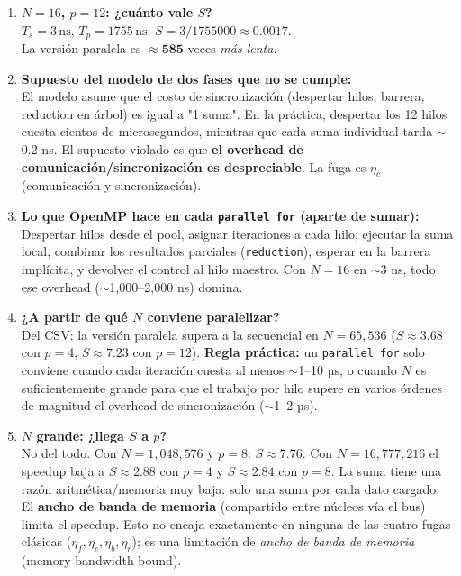 \documentclass[12pt,letterpaper]{article}
\begin{document}
\begin{enumerate}[start=3]

\item \textbf{$N=16$, $p=12$: ¿cuánto vale $S$?}\\
$T_s = 3\,\text{ns}$, $T_p = 1755\,\text{ns}$: $S = 3/1755000 \approx \mathbf{0.0017}$.\\
La versión paralela es $\approx \mathbf{585}$ veces \emph{más lenta}.

\item \textbf{Supuesto del modelo de dos fases que no se cumple:}\\
El modelo asume que el costo de sincronización (despertar hilos, barrera, reduction en árbol) es igual a "1 suma". En la práctica, despertar los 12 hilos cuesta cientos de microsegundos, mientras que cada suma individual tarda $\sim$0.2 ns. El supuesto violado es que \textbf{el overhead de comunicación/sincronización es despreciable}. La fuga es $\eta_c$ (comunicación y sincronización).

\item \textbf{Lo que OpenMP hace en cada \texttt{parallel for} (aparte de sumar):}\\
Despertar hilos desde el pool, asignar iteraciones a cada hilo, ejecutar la suma local, combinar los resultados parciales (\texttt{reduction}), esperar en la barrera implícita, y devolver el control al hilo maestro. Con $N=16$ en $\sim$3 ns, todo ese overhead ($\sim$1{,}000–2{,}000 ns) domina.

\item \textbf{¿A partir de qué $N$ conviene paralelizar?}\\
Del CSV: la versión paralela supera a la secuencial en $N = 65{,}536$ ($S \approx 3.68$ con $p=4$, $S \approx 7.23$ con $p=12$). \textbf{Regla práctica:} un \texttt{parallel for} solo conviene cuando cada iteración cuesta al menos $\sim$1–10 µs, o cuando $N$ es suficientemente grande para que el trabajo por hilo supere en varios órdenes de magnitud el overhead de sincronización ($\sim$1–2 µs).

\item \textbf{$N$ grande: ¿llega $S$ a $p$?}\\
No del todo. Con $N = 1{,}048{,}576$ y $p = 8$: $S \approx 7.76$. Con $N = 16{,}777{,}216$ el speedup baja a $S \approx 2.88$ con $p = 4$ y $S \approx 2.84$ con $p = 8$. La suma tiene una razón aritmética/memoria muy baja: solo una suma por cada dato cargado. El \textbf{ancho de banda de memoria} (compartido entre núcleos vía el bus) limita el speedup. Esto no encaja exactamente en ninguna de las cuatro fugas clásicas ($\eta_f, \eta_c, \eta_b, \eta_r$); es una limitación de \emph{ancho de banda de memoria} (memory bandwidth bound).

\end{enumerate}
\end{document}
